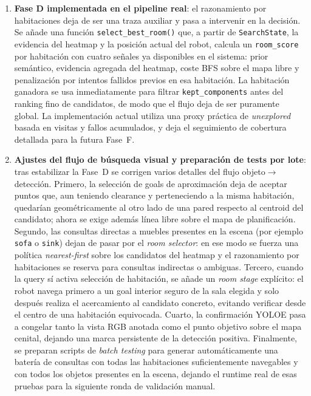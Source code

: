 \documentclass[11pt,a4paper]{article}
\begin{document}
\begin{enumerate}
  \item \textbf{Fase D implementada en el pipeline real}: el razonamiento por
        habitaciones deja de ser una traza auxiliar y pasa a intervenir en la
        decisión. Se añade una función \texttt{select\_best\_room()} que, a
        partir de \texttt{SearchState}, la evidencia del heatmap y la posición
        actual del robot, calcula un \texttt{room\_score} por habitación con
        cuatro señales ya disponibles en el sistema: prior semántico, evidencia
        agregada del heatmap, coste BFS sobre el mapa libre y penalización por
        intentos fallidos previos en esa habitación. La habitación ganadora se
        usa inmediatamente para filtrar \texttt{kept\_components} antes del
        ranking fino de candidatos, de modo que el flujo deja de ser
        puramente global. La implementación actual utiliza una proxy práctica
        de \textit{unexplored} basada en visitas y fallos acumulados, y deja
        el seguimiento de cobertura detallada para la futura Fase~F.

  \item \textbf{Ajustes del flujo de búsqueda visual y preparación de tests por
        lote}: tras estabilizar la Fase~D se corrigen varios detalles del flujo
        objeto$\rightarrow$detección. Primero, la selección de goals de
        aproximación deja de aceptar puntos que, aun teniendo clearance y
        perteneciendo a la misma habitación, quedarían geométricamente al otro
        lado de una pared respecto al centroid del candidato; ahora se exige
        además línea libre sobre el mapa de planificación. Segundo, las
        consultas directas a muebles presentes en la escena (por ejemplo
        \texttt{sofa} o \texttt{sink}) dejan de pasar por el \textit{room
        selector}: en ese modo se fuerza una política \textit{nearest-first}
        sobre los candidatos del heatmap y el razonamiento por habitaciones se
        reserva para consultas indirectas o ambiguas. Tercero, cuando la query
        sí activa selección de habitación, se añade un \textit{room stage}
        explícito: el robot navega primero a un goal interior seguro de la sala
        elegida y solo después realiza el acercamiento al candidato concreto,
        evitando verificar desde el centro de una habitación equivocada.
        Cuarto, la confirmación YOLOE pasa a congelar tanto la vista RGB
        anotada como el punto objetivo sobre el mapa cenital, dejando una marca
        persistente de la detección positiva. Finalmente, se preparan scripts
        de \textit{batch testing} para generar automáticamente una batería de
        consultas con todas las habitaciones suficientemente navegables y con
        todos los objetos presentes en la escena, dejando el runtime real de
        esas pruebas para la siguiente ronda de validación manual.

\end{enumerate}
\end{document}
